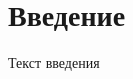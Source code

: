 \documentclass[12pt,a4paper, oneside]{extreport}
\begin{document}


\tableofcontents


\chapter*{Введение}

Текст введения







\nocite{*}
\printbibliography
\end{document}
